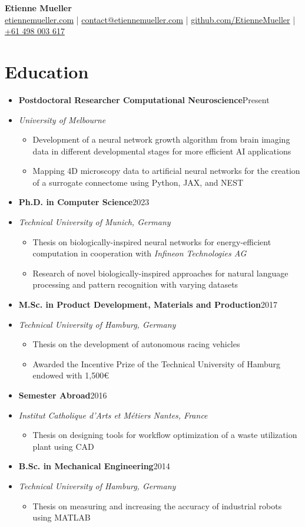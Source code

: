 \documentclass[a4paper,11pt]{article}
\newcommand{\entryBf}[2]{\item \textbf{#1}\hfill #2\vspace{-9pt}}
\newcommand{\entryIt}[1]{\item \textit{\small #1}\vspace{-7pt}}
\newcommand{\cvItemizeBegin}{\begin{itemize}[rightmargin=75pt]}
\newcommand{\cvItemizeEnd}{\end{itemize} \vspace{-7pt}}
\newcommand{\cvItem}[1]{\item[--] \small #1\vspace{-2pt}}
\begin{document}
\begin{center}
    \textbf{\Huge Etienne Mueller} \\ 
    \vspace{12pt}
    \small
    \faHome \hspace{.5pt} 
    \href{https://www.etiennemueller.com}{etiennemueller.com} |
    \faEnvelope \hspace{.5pt} 
    \href{mailto:contact@etiennemueller.com}{contact@etiennemueller.com} |
    \faGithub \hspace{.5pt} 
    \href{https://github.com/EtienneMueller/}{github.com/EtienneMueller} |
    \faPhone \hspace{.5pt} 
    \href{tel:+61498003617}{+61 498 003 617}
\end{center}

\section{Education}
\begin{itemize}
    
    \entryBf{Postdoctoral Researcher Computational Neuroscience}{Present}
    \entryIt{University of Melbourne}
    \cvItemizeBegin
    \cvItem{Development of a neural network growth algorithm from brain imaging data in different developmental stages for more efficient AI applications}
    \cvItem{Mapping 4D microscopy data to artificial neural networks for the creation of a surrogate connectome using Python, JAX, and NEST}
    \cvItemizeEnd

    \entryBf{Ph.D. in Computer Science}{2023}
    \entryIt{Technical University of Munich, Germany}{}
    \cvItemizeBegin
        \cvItem{Thesis on biologically-inspired neural networks for energy-efficient computation in cooperation with \textit{Infineon Technologies AG}}
        \cvItem{Research of novel biologically-inspired approaches for natural language processing and pattern recognition with varying datasets}
    \cvItemizeEnd
    
    \entryBf{M.Sc. in Product Development, Materials and Production}{2017}
    \entryIt{Technical University of Hamburg, Germany}
    \cvItemizeBegin
        \cvItem{Thesis on the development of autonomous racing vehicles}
        \cvItem{Awarded the Incentive Prize of the Technical University of Hamburg endowed with 1,500\euro}
    \cvItemizeEnd
    
    \entryBf{Semester Abroad}{2016}
    \entryIt{Institut Catholique d'Arts et M\'etiers Nantes, France}
    \cvItemizeBegin
        \cvItem{Thesis on designing tools for workflow optimization of a waste utilization plant using CAD}
    \cvItemizeEnd
    
    \entryBf{B.Sc. in Mechanical Engineering}{2014}
    \entryIt{Technical University of Hamburg, Germany}
    \cvItemizeBegin
        \cvItem{Thesis on measuring and increasing the accuracy of industrial robots using MATLAB}
    \cvItemizeEnd
\end{itemize}
\end{document}

